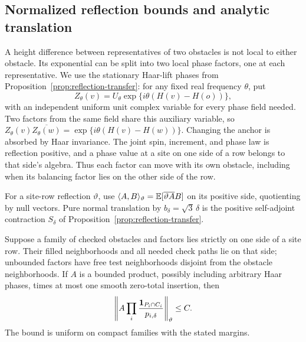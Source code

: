 \subsection{Normalized reflection bounds and analytic translation}

A height difference between representatives of two obstacles is not
local to either obstacle.  Its exponential can be split into two local
phase factors, one at each representative.  We use the stationary
Haar-lift phases from Proposition~\ref{prop:reflection-transfer}: for any
fixed real frequency $\theta$, put
\begin{equation}\label{pins:haar-phase}
 Z_\theta(v)=U_\theta\exp\{i\theta(H(v)-H(o))\},
\end{equation}
with an independent uniform unit complex variable for every phase field
needed.  Two factors from the same field share this auxiliary variable,
so
$Z_\theta(v)\overline{Z_\theta(w)}
=\exp\{i\theta(H(v)-H(w))\}$.
Changing the anchor is absorbed by Haar invariance.  The joint spin,
increment, and phase law is reflection positive, and a phase value at a
site on one side of a row belongs to that side's algebra.  Thus each
factor can move with its own obstacle, including when its balancing
factor lies on the other side of the row.

For a site-row reflection $\vartheta$, use
$\langle A,B\rangle_\vartheta=\mathbb E[\overline{\vartheta A}B]$ on its
positive side, quotienting by null vectors.  Pure normal translation
by $b_\delta=\sqrt3\,\delta$ is the positive self-adjoint contraction
$S_\delta$ of Proposition~\ref{prop:reflection-transfer}.

\begin{lemma}\label{pins:side-norm}
Suppose a family of checked obstacles and factors lies strictly on one
side of a site row.  Their filled neighborhoods and all needed check
paths lie on that side; unbounded factors have free test neighborhoods
disjoint from the obstacle neighborhoods.  If $A$ is a bounded product,
possibly including arbitrary Haar phases, times at most one smooth
zero-total insertion, then
\begin{equation}\label{pins:normalized-side-bound}
 \left\|A\prod_i\frac{\mathbf 1_{P_i\cap C_i}}{p_{i,\delta}}
       \right\|_\vartheta\le C.
\end{equation}
The bound is uniform on compact families with the stated margins.
\end{lemma}

